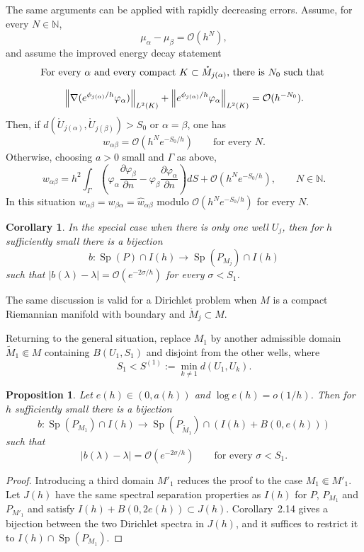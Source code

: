 \documentclass[11pt,a4paper]{article}
\newcommand{\N}{\mathbb N}
\newcommand{\Sp}{\operatorname{Sp}}
\newcommand{\cO}{\mathcal O}
\newcommand{\norm}[1]{\left\lVert #1\right\rVert}
\numberwithin{equation}{section}
\newtheorem{proposition}[theorem]{Proposition}
\newtheorem{corollary}[theorem]{Corollary}
\theoremstyle{remark}
\begin{document}
The same arguments can be applied with rapidly decreasing errors. Assume, for every $N\in\N$,
\begin{equation}
\mu_\alpha-\mu_\beta=\cO(h^N),
\tag{2.24'}
\end{equation}
and assume the improved energy decay statement
\begin{equation}
\begin{minipage}{0.84\textwidth}
For every $\alpha$ and every compact $K\subset\mathring M_{j(\alpha)}$, there is $N_0$ such that
\[
\norm{\nabla(e^{\phi_{j(\alpha)}/h}\varphi_\alpha)}_{L^2(K)}+
\norm{e^{\phi_{j(\alpha)}/h}\varphi_\alpha}_{L^2(K)}=\cO(h^{-N_0}).
\]
\end{minipage}
\end{equation}
Then, if $d(\mathring U_{j(\alpha)},\mathring U_{j(\beta)})>S_0$ or $\alpha=\beta$, one has
\[
w_{\alpha\beta}=\cO(h^Ne^{-S_0/h})\qquad\text{for every }N.
\]
Otherwise, choosing $a>0$ small and $\Gamma$ as above,
\begin{equation}
w_{\alpha\beta}=h^2\int_\Gamma\left(\varphi_\alpha\frac{\partial\varphi_\beta}{\partial n}
-\varphi_\beta\frac{\partial\varphi_\alpha}{\partial n}\right)dS
+\cO(h^Ne^{-S_0/h}),\qquad N\in\N.
\tag{2.25'}
\end{equation}
In this situation $w_{\alpha\beta}=w_{\beta\alpha}=\widehat w_{\alpha\beta}$ modulo $\cO(h^Ne^{-S_0/h})$ for every $N$.

\begin{corollary}
In the special case when there is only one well $U_j$, then for $h$ sufficiently small there is a bijection
\[
b:\Sp(P)\cap I(h)\longrightarrow\Sp(P_{M_j})\cap I(h)
\]
such that $|b(\lambda)-\lambda|=\cO(e^{-2\sigma/h})$ for every $\sigma<S_1$.
\end{corollary}
The same discussion is valid for a Dirichlet problem when $M$ is a compact Riemannian manifold with boundary and $\mathring M_j\subset M$.

Returning to the general situation, replace $M_1$ by another admissible domain $\widetilde M_1\Subset M$ containing $B(U_1,S_1)$ and disjoint from the other wells, where
\[
S_1<S^{(1)}:=\min_{k\ne1}d(U_1,U_k).
\]

\begin{proposition}
Let $e(h)\in(0,a(h))$ and $\log e(h)=o(1/h)$. Then for $h$ sufficiently small there is a bijection
\[
b:\Sp(P_{M_1})\cap I(h)\longrightarrow
\Sp(P_{\widetilde M_1})\cap(I(h)+B(0,e(h)))
\]
such that
\[
|b(\lambda)-\lambda|=\cO(e^{-2\sigma/h})\qquad\text{for every }\sigma<S_1.
\]
\end{proposition}
\begin{proof}
Introducing a third domain $M'_1$ reduces the proof to the case $M_1\Subset M'_1$. Let $J(h)$ have the same spectral separation properties as $I(h)$ for $P$, $P_{M_1}$ and $P_{M'_1}$ and satisfy $I(h)+B(0,2e(h))\subset J(h)$. Corollary~2.14 gives a bijection between the two Dirichlet spectra in $J(h)$, and it suffices to restrict it to $I(h)\cap\Sp(P_{M_1})$.
\end{proof}
\end{document}
